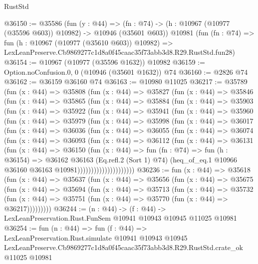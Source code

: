 \begin{lexlean}{RustStd}
\begin{coremodule}
@36150 := @35586
    (fun (y : @44) =>
    (fn : @74) -> (h : @10967 (@10977 (@35596 @603)) @10982) -> @10946 (@35601 @603))
    @10981
    (fun (fn : @74) =>
    fun (h : @10967 (@10977 (@35610 @603)) @10982) =>
    LexLeanPreserve.Cb9869277c1d8a0f45caac35f73abb3d8.R29.RustStd.fun28)
@36154 := @10967 (@10977 (@35596 @1632)) @10982
@36159 := Option.noConfusion.{0, 0} (@10946 (@35601 @1632)) @74
@36160 := @2826 @74
@36162 := @36159 @36160 @74
@36163 := @10980 @11025
@36217 := @35789
    (fun (x : @44) =>
    @35808
      (fun (x : @44) =>
      @35827
        (fun (x : @44) =>
        @35846
          (fun (x : @44) =>
          @35865
            (fun (x : @44) =>
            @35884
              (fun (x : @44) =>
              @35903
                (fun (x : @44) =>
                @35922
                  (fun (x : @44) =>
                  @35941
                    (fun (x : @44) =>
                    @35960
                      (fun (x : @44) =>
                      @35979
                        (fun (x : @44) =>
                        @35998
                          (fun (x : @44) =>
                          @36017
                            (fun (x : @44) =>
                            @36036
                              (fun (x : @44) =>
                              @36055
                                (fun (x : @44) =>
                                @36074
                                  (fun (x : @44) =>
                                  @36093
                                    (fun (x : @44) =>
                                    @36112
                                      (fun (x : @44) =>
                                      @36131
                                        (fun (x : @44) =>
                                        @36150
                                          (fun (x : @44) =>
                                          fun (fn : @74) =>
                                          fun (h : @36154) =>
                                          @36162
                                            @36163
                                            (Eq.refl.{2} (Sort 1) @74)
                                            (heq_of_eq.{1}
                                              @10966
                                              @36160
                                              @36163
                                              @10981)))))))))))))))))))))
@36236 := fun (x : @44) =>
  @35618
    (fun (x : @44) =>
    @35637
      (fun (x : @44) =>
      @35656
        (fun (x : @44) =>
        @35675
          (fun (x : @44) =>
          @35694
            (fun (x : @44) =>
            @35713
              (fun (x : @44) =>
              @35732
                (fun (x : @44) => @35751 (fun (x : @44) => @35770 (fun (x : @44) => @36217)))))))))
@36244 := (n : @44) ->
  (f : @44) -> LexLeanPreservation.Rust.FunSem @10941 @10943 @10945 @11025 @10981
@36254 := fun (n : @44) =>
  fun (f : @44) =>
  LexLeanPreservation.Rust.simulate
    @10941
    @10943
    @10945
    LexLeanPreserve.Cb9869277c1d8a0f45caac35f73abb3d8.R29.RustStd.crate_ok
    @11025
    @10981
\end{coremodule}
\end{lexlean}
